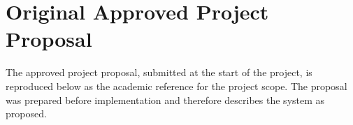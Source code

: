 \chapter*{Original Approved Project Proposal}

The approved project proposal, submitted at the start of the project, is
reproduced below as the academic reference for the project scope. The
proposal was prepared before implementation and therefore describes the
system as proposed.

{
\renewcommand{\thesection}{\arabic{section}}
\setcounter{section}{0}
\setlength{\emergencystretch}{3em}








\setcounter{section}{0}
}